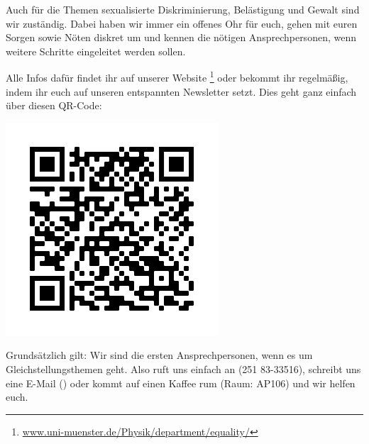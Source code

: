 \begin{multicols}{2}
Auch für die Themen sexualisierte Diskriminierung, Belästigung und Gewalt sind wir zuständig. Dabei haben wir immer ein offenes Ohr für euch, gehen mit euren Sorgen sowie Nöten diskret um und kennen die nötigen Ansprechpersonen, wenn weitere Schritte eingeleitet werden sollen.

Alle Infos dafür findet ihr auf unserer Website \footnote{\url{www.uni-muenster.de/Physik/department/equality/}} oder bekommt ihr regelmäßig, indem ihr euch auf unseren entspannten Newsletter setzt. Dies geht ganz einfach über diesen QR-Code: \\
\begin{center}
    \includegraphics[width=\columnwidth]{res/gst_QR.png} %
\end{center}

Grundsätzlich gilt: Wir sind die ersten Ansprechpersonen, wenn es um Gleichstellungsthemen geht. Also ruft uns einfach an (251 83-33516), schreibt uns eine E-Mail (\textbf{}) oder kommt auf einen Kaffee rum (Raum: AP106) und wir helfen euch.


\end{multicols}


